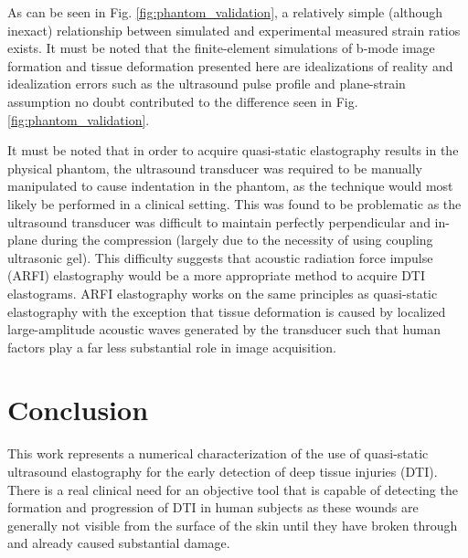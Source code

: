 			As can be seen in Fig. \ref{fig:phantom_validation}, a relatively simple (although inexact) relationship between simulated and experimental measured strain ratios exists. It must be noted that the finite-element simulations of b-mode image formation and tissue deformation presented here are idealizations of reality and idealization errors such as the ultrasound pulse profile and plane-strain assumption no doubt contributed to the difference seen in Fig. \ref{fig:phantom_validation}.

			It must be noted that in order to acquire quasi-static elastography results in the physical phantom, the ultrasound transducer was required to be manually manipulated to cause indentation in the phantom, as the technique would most likely be performed in a clinical setting. This was found to be problematic as the ultrasound transducer was difficult to maintain perfectly perpendicular and in-plane during the compression (largely due to the necessity of using coupling ultrasonic gel). This difficulty suggests that acoustic radiation force impulse (ARFI) elastography would be a more appropriate method to acquire DTI elastograms. ARFI elastography works on the same principles as quasi-static elastography with the exception that tissue deformation is caused by localized large-amplitude acoustic waves generated by the transducer such that human factors play a far less substantial role in image acquisition.

	\section{Conclusion}
		This work represents a numerical characterization of the use of quasi-static ultrasound elastography for the early detection of deep tissue injuries (DTI). There is a real clinical need for an objective tool that is capable of detecting the formation and progression of DTI in human subjects as these wounds are generally not visible from the surface of the skin until they have broken through and already caused substantial damage.

